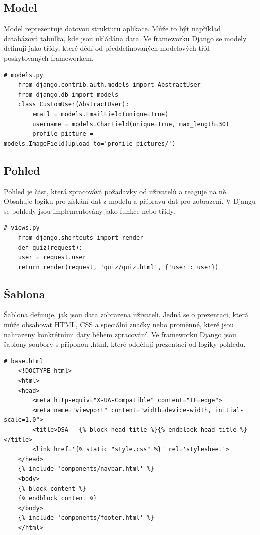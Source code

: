 \documentclass[12pt, a4paper,
twoside,        %
openright
]{report}
\begin{document}
\subsection{Model}
Model reprezentuje datovou strukturu aplikace. Může to být například databázová tabulka, kde jsou ukládána data. Ve frameworku Django se modely definují jako třídy, které dědí od předdefinovaných modelových tříd poskytovaných frameworkem.
\begin{lstlisting}[style=Python, caption={Příklad modelu Uživatel}]
	# models.py
	from django.contrib.auth.models import AbstractUser
	from django.db import models
	class CustomUser(AbstractUser):
    	email = models.EmailField(unique=True)
    	username = models.CharField(unique=True, max_length=30)
    	profile_picture = models.ImageField(upload_to='profile_pictures/')
\end{lstlisting}

\subsection{Pohled}
Pohled je část, která zpracovává požadavky od uživatelů a reaguje na ně. Obsahuje logiku pro získání dat z modelu a přípravu dat pro zobrazení. V Djangu se pohledy jsou implementovány jako funkce nebo třídy.
\begin{lstlisting}[style=Python, caption={Příklad pohledu Kvíz}]
	# views.py
	from django.shortcuts import render
	def quiz(request):
   	user = request.user
   	return render(request, 'quiz/quiz.html', {'user': user})
\end{lstlisting}

\subsection{Šablona}
Šablona definuje, jak jsou data zobrazena uživateli. Jedná se o prezentaci, která může obsahovat HTML, CSS a speciální značky nebo proměnné, které jsou nahrazeny konkrétními daty během zpracování. Ve frameworku Django jsou šablony soubory s příponou .html, které oddělují prezentaci od logiky pohledu.
\begin{lstlisting}[style=Python, caption={Příklad základní šablony}]
	# base.html
	<!DOCTYPE html>
	<html>
	<head>
		<meta http-equiv="X-UA-Compatible" content="IE=edge">
		<meta name="viewport" content="width=device-width, initial-scale=1.0">
		<title>DSA - {% block head_title %}{% endblock head_title %}</title>
		<link href='{% static "style.css" %}' rel='stylesheet'>
	</head>
	{% include 'components/navbar.html' %}
	<body>
	{% block content %}
	{% endblock content %}
	</body>
	{% include 'components/footer.html' %}
	</html>
\end{lstlisting}
\end{document}
